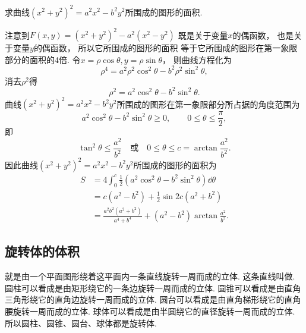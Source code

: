 \begin{example}
求曲线\((x^2+y^2)^2 = a^2 x^2 - b^2 y^2\)所围成的图形的面积.
\begin{solution}
注意到\(F(x,y) = (x^2+y^2)^2 - a^2(x^2-y^2)\)
既是关于变量\(x\)的偶函数，
也是关于变量\(y\)的偶函数，
所以它所围成的图形的面积
等于它所围成的图形在第一象限部分的面积的4倍.
令\(x = \rho \cos\theta,
y = \rho \sin\theta\)，
则曲线方程化为\begin{equation*}
	\rho^4 = a^2 \rho^2 \cos^2\theta - b^2 \rho^2 \sin^2\theta,
\end{equation*}
消去\(\rho^2\)得\begin{equation*}
	\rho^2 = a^2 \cos^2\theta - b^2 \sin^2\theta.
\end{equation*}
曲线\((x^2+y^2)^2 = a^2 x^2 - b^2 y^2\)所围成的图形在第一象限部分所占据的角度范围为\begin{equation*}
	a^2 \cos^2\theta - b^2 \sin^2\theta \geq 0,
	\qquad
	0 \leq \theta \leq \frac\pi2,
\end{equation*}
即\begin{equation*}
	\tan^2\theta \leq \frac{a^2}{b^2}
	\quad\text{或}\quad
	0 \leq \theta \leq c = \arctan\frac{a^2}{b^2}.
\end{equation*}
因此曲线\((x^2+y^2)^2 = a^2 x^2 - b^2 y^2\)所围成的图形的面积为\begin{align*}
	S &= 4 \int_0^c \frac12 (a^2 \cos^2\theta - b^2 \sin^2\theta) \dd{\theta} \\
	&= c (a^2 - b^2) + \frac12 \sin2c (a^2 + b^2) \\
	&= \frac{a^2 b^2 (a^2 + b^2)}{a^4 + b^4} + (a^2 - b^2) \arctan\frac{a^2}{b^2}.
\end{align*}
\end{solution}
\end{example}

\subsection{旋转体的体积}
就是由一个平面图形绕着这平面内一条直线旋转一周而成的立体.
这条直线叫做.
圆柱可以看成是由矩形绕它的一条边旋转一周而成的立体.
圆锥可以看成是由直角三角形绕它的直角边旋转一周而成的立体.
圆台可以看成是由直角梯形绕它的直角腰旋转一周而成的立体.
球体可以看成是由半圆绕它的直径旋转一周而成的立体.
所以圆柱、圆锥、圆台、球体都是旋转体.

